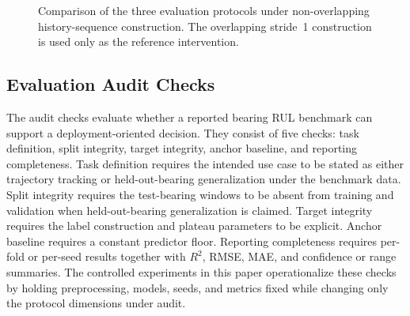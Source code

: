 \documentclass[pdflatex,sn-basic,NameDate]{sn-jnl}
\begin{document}
\begin{figure}[t]
\centering
{}
\caption{Comparison of the three evaluation protocols under non-overlapping history-sequence construction. The overlapping stride~1 construction is used only as the reference intervention.}
\label{fig:protocols}
\end{figure}

\subsection{Evaluation Audit Checks}
The audit checks evaluate whether a reported bearing RUL benchmark can support a deployment-oriented decision. They consist of five checks: task definition, split integrity, target integrity, anchor baseline, and reporting completeness. Task definition requires the intended use case to be stated as either trajectory tracking or held-out-bearing generalization under the benchmark data. Split integrity requires the test-bearing windows to be absent from training and validation when held-out-bearing generalization is claimed. Target integrity requires the label construction and plateau parameters to be explicit. Anchor baseline requires a constant predictor floor. Reporting completeness requires per-fold or per-seed results together with $R^2$, RMSE, MAE, and confidence or range summaries. The controlled experiments in this paper operationalize these checks by holding preprocessing, models, seeds, and metrics fixed while changing only the protocol dimensions under audit.
\end{document}

